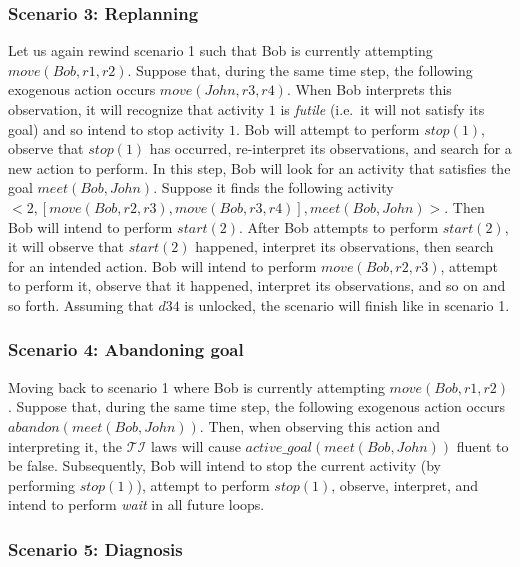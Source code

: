 \subsubsection{Scenario 3: Replanning~\citep{blount_towards_2014}}
\label{subsubsec:aia_scenario_3}

Let us again rewind scenario 1 such that Bob is currently attempting $move(Bob, r1, r2)$.
Suppose that, during the same time step, the following exogenous action occurs $move(John, r3, r4)$.
When Bob interprets this observation, it will recognize that activity $1$ is \textit{futile} (i.e.~it will not satisfy its goal) and so intend to stop activity $1$.
Bob will attempt to perform $stop(1)$, observe that $stop(1)$ has occurred, re-interpret its observations, and search for a new action to perform.
In this step, Bob will look for an activity that satisfies the goal $meet(Bob, John)$.
Suppose it finds the following activity $<2, [move(Bob, r2,r3), move(Bob, r3,r4)],meet(Bob,John)>$.
Then Bob will intend to perform $start(2)$.
After Bob attempts to perform $start(2)$, it will observe that $start(2)$ happened, interpret its observations, then search for an intended action.
Bob will intend to perform $move(Bob, r2,r3)$, attempt to perform it, observe that it happened, interpret its observations, and so on and so forth.
Assuming that $d34$ is unlocked, the scenario will finish like in scenario 1.

\subsubsection{Scenario 4: Abandoning goal~\citep{blount_towards_2014}}
\label{subsubsec:aia_scenario_4}

Moving back to scenario 1 where Bob is currently attempting $move(Bob, r1, r2)$.
Suppose that, during the same time step, the following exogenous action occurs $abandon(meet(Bob, John))$.
Then, when observing this action and interpreting it, the $\mathcal{TI}$ laws will cause $active\_goal(meet(Bob, John))$ fluent to be false.
Subsequently, Bob will intend to stop the current activity (by performing $stop(1)$), attempt to perform $stop(1)$, observe, interpret, and intend to perform \textit{wait} in all future loops.

\subsubsection{Scenario 5: Diagnosis~\citep{blount_towards_2014}}
\label{subsubsec:aia_scenario_5}

